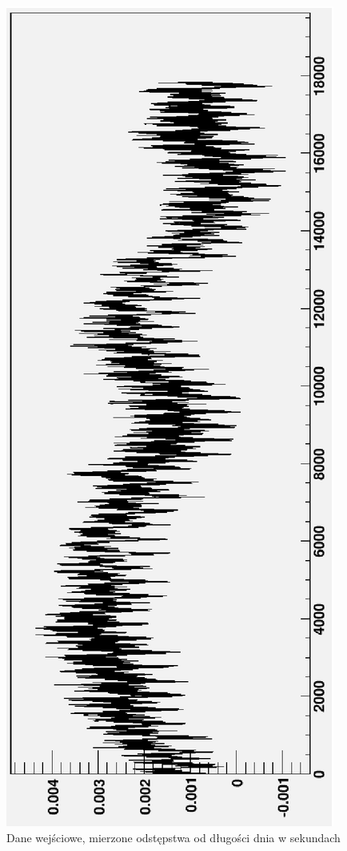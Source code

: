 \documentclass[12pt,a4]{article}
\begin{document}
\begin{figure}[htbp]
  \includegraphics[]{doc/img/lod.eps}
  \caption{Dane wejściowe, mierzone odstępstwa od długości dnia w sekundach}
  \label{fig:lod}
\end{figure}
\end{document}
